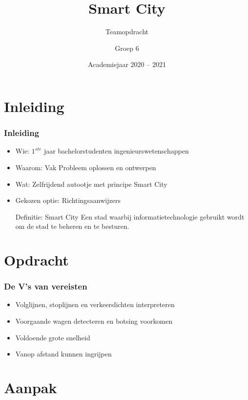 \documentclass
   [kulak] %
   {kulakbeamer}
\title[Smart City]{Smart City}
\subtitle{Teamopdracht}
\author[Groep 6]{Groep 6}%
\institute[Kulak]{KU Leuven Kulak}
\date{Academiejaar 2020 -- 2021}
\begin{document}
\begin{titleframe}
\titlepage
\end{titleframe}

\begin{outlineframe}[Overzicht]
\tableofcontents
\end{outlineframe}


\section{Inleiding}

\begin{frame}
\frametitle{Inleiding}
\begin{itemize}
	\item Wie: $1^{ste}$ jaar bachelorstudenten ingenieurswetenschappen
	\item Waarom: Vak Probleem oplossen en ontwerpen
	\item Wat: Zelfrijdend autootje met principe Smart City
	\item Gekozen optie: Richtingsaanwijzers

	\begin{block}{Definitie: Smart City}
		Een stad waarbij informatietechnologie gebruikt wordt om de stad te beheren en te besturen. \cite{SmartCity}
	\end{block}
\end{itemize}
\end{frame}


\section[Opdracht]{Opdracht}%

\begin{frame}
\frametitle{De V's van vereisten}
\begin{itemize}
	\item Volglijnen, stoplijnen en verkeerslichten interpreteren
	\item Voorgaande wagen detecteren en botsing voorkomen
	\item Voldoende grote snelheid
	\item Vanop afstand kunnen ingrijpen
\end{itemize}

\end{frame}



\section{Aanpak}
\end{document}

